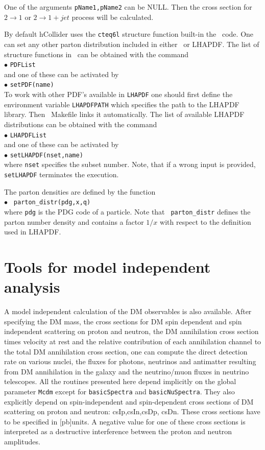 \documentclass[12pt,a4paper]{article}
\begin{document}
  One of the arguments \verb|pName1,pName2| can be NULL. Then the cross section for $2\to1$   or $2\to1 + jet $
process will be calculated. 

By default hCollider uses the {\tt cteq6l} structure function built-in
the \micro\ code. One can set any other parton distribution included in
either \micro\ or LHAPDF.  The list  of structure functions in \micro\ can be
obtained with the command \\
$\bullet$ \verb|PDFList| \\
and one of these can be activated by\\ 
$\bullet$ \verb|setPDF(name)|\\
To work with other PDF's available in {\tt LHAPDF}  one should first define the environment
variable {\tt LHAPDFPATH}  which specifies the path to the LHAPDF library. Then
\micro\ Makefile  links it automatically. The list of available LHAPDF
distributions can be obtained with the command\\
$\bullet$ \verb|LHAPDFList|\\
and one of these can be activated by \\
$\bullet$ \verb|setLHAPDF(nset,name)|\\
where {\tt nset} specifies the subset number. Note, that if a wrong input is provided, 
\verb|setLHAPDF| terminates the execution.

\noindent
The parton densities are  defined  by the function \\
$\bullet$ \verb| parton_distr(pdg,x,q)|\\
where {\tt pdg} is the PDG code of a particle. Note that \verb| parton_distr| defines the parton number density and  
contains a factor $1/x$  with respect to the  definition used in LHAPDF.  

 
\section{Tools for model independent analysis}
\label{mdlIndep}

A model independent calculation of the DM observables is also available.
After specifying the DM mass, the cross sections for DM  spin dependent and  spin independent scattering on proton and neutron, the DM annihilation cross section times velocity at rest and the relative contribution of  each annihilation channel to the total DM annihilation cross section, one can compute the direct detection rate on   various nuclei, the fluxes for photons, neutrinos and antimatter resulting from DM annihilation in the galaxy and the neutrino/muon fluxes in neutrino telescopes.  
All the routines presented here 
depend implicitly on the  global parameter {\tt Mcdm} except for {\tt basicSpectra} and {\tt basicNuSpectra}.
They also explicitly depend on spin-independent and spin-dependent cross sections of DM scattering
on proton and neutron: csIp,csIn,csDp, csDn. These cross sections have to be specified in
[pb]units. A negative value for one of these cross sections is interpreted as a destructive 
interference between the proton and neutron amplitudes. 
\end{document}
